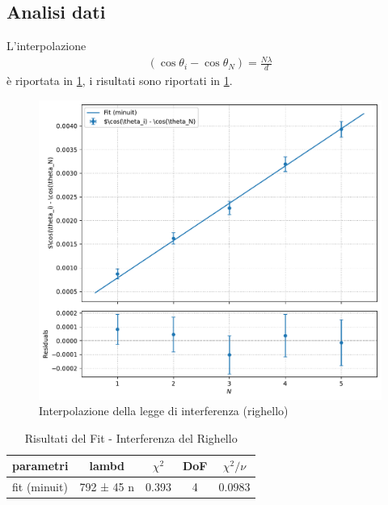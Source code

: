 \documentclass[a4paper]{article}
\begin{document}
\subsection{Analisi dati}
L'interpolazione
\begin{align}
    (\cos\theta_i - \cos\theta_N) = \frac{N\lambda}{d}
\end{align}
è riportata in \cref{fig:interferenza-righello-interpolazione}, i risultati sono riportati in \cref{tab:interferenza-righello-risultati}.
\begin{figure}[htbp]
\centering
\includegraphics[width=1.0\textwidth]{./grafici/righello.pdf}
\caption{Interpolazione della legge di interferenza (righello)}
\label{fig:interferenza-righello-interpolazione}
\end{figure}

\begin{table}[htbp]
\centering
\caption{Risultati del Fit - Interferenza del Righello}
\label{tab:interferenza-righello-risultati}
\begin{tabular}{|l|cccc|}
\hline
parametri & lambd & $\chi^2$ & DoF & $\chi^2/\nu$ \\\hline\hline
fit (minuit) & 792 ± 45 n & 0.393 & 4 & 0.0983 \\\hline
\end{tabular}
\end{table}
\end{document}
